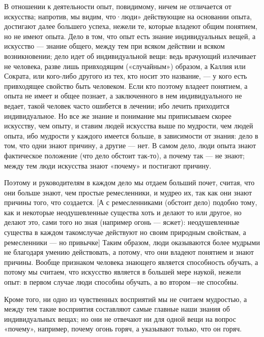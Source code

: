 \documentclass{article}
\begin{document}
В отношении к деятельности опыт, повидимому, ничем не отличается от искусства; напротив, мы видим, что·люди» действующие на основании опыта, достигают далее большего успеха, нежели те, которые владеют общим понятием, но не имеют опыта. Дело в том, что опыт есть знание индивидуальных вещей, а искусство — знание общего, между тем при всяком действии и всяком возникновении; дело идет об индивидуальной вещи: ведь врачующий излечивает не человека, разве лишь привходящим
\footnotemark[2]
\footnotemark[3]
(«случайным») образом, а Каллия или Сократа, или кого-либо другого из тех, кто носит это название, — у кого есть привходящее свойство быть человеком. Если кто поэтому владеет понятием, а опыта не имеет и общее познает, а заключенного в нем индивидуального не ведает, такой человек часто ошибется в лечении; ибо лечить приходится индивидуальное. Но все же знание и понимание мы приписываем скорее искусству, чем опыту, и ставим людей искусства
\footnotemark[4]
выше по мудрости, чем людей опыта, ибо мудрости у каждого имеется больше, в зависимости от знания: дело в том, что одни знают причину, а другие — нет. В самом дело, люди опыта знают фактическое положение
\footnotemark[5]
(что дело обстоит так-то), а почему так — не знают; между тем люди искусства знают «почему» и постигают причину.
\footnotemark[6]

Поэтому и руководителям в каждом дело мы отдаем больший почет, считая, что они больше знают, чем простые ремесленники, и мудрео их, так как они знают причины того, что создается. [А с ремесленниками (обстоит дело) подобно тому, как и некоторые неодушевленные существа хоть и делают то или другое, но делают это, сами того но зная (например огонь — ясжет): неодушевленные существа в каждом такомслучае действуют но своим природным свойствам, а ремесленники — но привычке] Таким образом, люди оказываются более мудрыми не благодаря умению действовать, а потому, что они владеют понятием и знают причины. Вообще признаком человека знающего является способность обучать, а потому мы считаем, что искусство является в большей мере наукой, нежели опыт: в первом случае люди способны обучать, а во втором—не способны.

Кроме того, ни одно из чувственных восприятий мы не считаем мудростью, а между тем такие восприятия составляют самые главные наши знания об индивидуальных вещах; но они не отвечают ни для одной вещи на вопрос «почему», например, почему огонь горяч, а указывают только, что он горяч.
\end{document}
